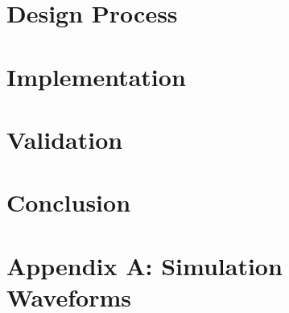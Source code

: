 \documentclass[12pt,letterpaper,titlepage]{article}
\begin{document}
\begin{raggedright}
\section{Design Process}


\section{Implementation}

\section{Validation}

\section{Conclusion}

\clearpage

\section{Appendix A: Simulation Waveforms}

\clearpage



\end{raggedright}
\end{document}
